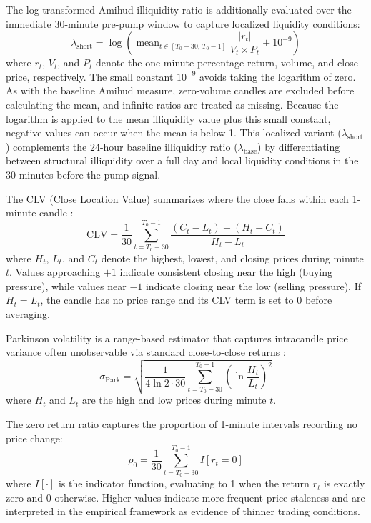 The log-transformed Amihud illiquidity ratio is additionally evaluated over the immediate 30-minute pre-pump window to capture localized liquidity conditions:
\begin{equation}
    \label{eq:short_illiq}
    \lambda_{\text{short}} =
    \log\!\left(
    \operatorname{mean}_{t \in [T_0-30,\, T_0-1]}
    \frac{|r_t|}{V_t \times P_t}
    + 10^{-9}
    \right)
\end{equation}
where $r_t$, $V_t$, and $P_t$ denote the one-minute percentage return, volume, and close price, respectively. The small constant $10^{-9}$ avoids taking the logarithm of zero. As with the baseline Amihud measure, zero-volume candles are excluded before calculating the mean, and infinite ratios are treated as missing. Because the logarithm is applied to the mean illiquidity value plus this small constant, negative values can occur when the mean is below 1. This localized variant ($\lambda_{\text{short}}$) complements the 24-hour baseline illiquidity ratio ($\lambda_{\text{base}}$) by differentiating between structural illiquidity over a full day and local liquidity conditions in the 30 minutes before the pump signal.

The CLV (Close Location Value) summarizes where the close falls within each 1-minute candle \cite{ulrich2024clv}:
\begin{equation}
    \label{eq:clv}
    \overline{\text{CLV}} = \frac{1}{30} \sum_{t=T_0-30}^{T_0-1} \frac{(C_t - L_t) - (H_t - C_t)}{H_t - L_t}
\end{equation}
where $H_t$, $L_t$, and $C_t$ denote the highest, lowest, and closing prices during minute $t$. Values approaching $+1$ indicate consistent closing near the high (buying pressure), while values near $-1$ indicate closing near the low (selling pressure). If $H_t=L_t$, the candle has no price range and its CLV term is set to 0 before averaging.

Parkinson volatility is a range-based estimator that captures intracandle price variance often unobservable via standard close-to-close returns \cite{parkinson1980extreme}:
\begin{equation}
    \label{eq:parkinson}
    \sigma_{\text{Park}} = \sqrt{\frac{1}{4 \ln 2 \cdot 30} \sum_{t=T_0-30}^{T_0-1} \!\left( \ln \frac{H_t}{L_t} \right)^{\!2}}
\end{equation}
where $H_t$ and $L_t$ are the high and low prices during minute $t$.

The zero return ratio captures the proportion of 1-minute intervals recording no price change:
\begin{equation}
    \label{eq:zero_ret}
    \rho_0 = \frac{1}{30} \sum_{t=T_0-30}^{T_0-1} I[r_t = 0]
\end{equation}
where $I[\cdot]$ is the indicator function, evaluating to 1 when the return $r_t$ is exactly zero and 0 otherwise. Higher values indicate more frequent price staleness and are interpreted in the empirical framework as evidence of thinner trading conditions.

